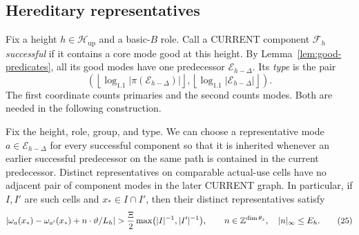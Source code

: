 \subsection{Hereditary representatives}

Fix a height \(h\in\mathcal H_{\mathrm{up}}\) and a basic-\(B\)
role.  Call a CURRENT component \(\mathcal F_h\)
\emph{successful} if it contains a core mode good at this height.
By Lemma~\ref{lem:good-predicates}, all its good modes have one
predecessor \(\mathcal E_{h-\Delta}\).  Its \emph{type} is the pair
\[
 \left(
  \left\lfloor\log_{1.1}|\pi(\mathcal E_{h-\Delta})|\right\rfloor,
  \left\lfloor\log_{1.1}|\mathcal E_{h-\Delta}|\right\rfloor
 \right).
\]
The first coordinate counts primaries and the second counts modes.
Both are needed in the following construction.

\begin{lemma}
\label{lem:hereditary-labels}
Fix the height, role, group, and type.  We can choose a representative
mode \(a\in\mathcal E_{h-\Delta}\) for every successful component so
that it is inherited whenever an earlier successful predecessor on
the same path is contained in the current predecessor.
Distinct representatives on comparable actual-use cells have no
adjacent pair of component modes in the later CURRENT graph.
In particular, if \(I,I'\) are such cells and \(x_*\in I\cap I'\),
then their distinct representatives satisfy
\begin{equation*}
 \left|\omega_a(x_*)-\omega_{a'}(x_*)
                     +n\cdot\vartheta/L_h\right|
  >\frac{\Xi}{2}
       \max\bigl(|I|^{-1},|I'|^{-1}\bigr),
 \qquad n\in\mathbb Z^{\dim\theta_z},\quad |n|_\infty\le E_h .
 \tag{25}\label{eq:src-25}
\end{equation*}
\end{lemma}

